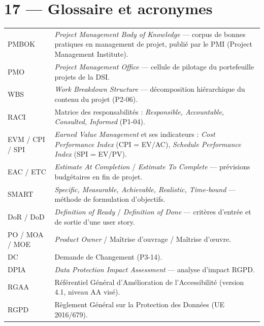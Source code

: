 \documentclass[11pt,a4paper,oneside]{report}
\begin{document}
\newpage
\section*{17 — Glossaire et acronymes}

\renewcommand{\arraystretch}{1.3}
\begin{tabularx}{\textwidth}{L{3cm} Y}
\toprule
{} &  \\
\midrule
PMBOK              & \textit{Project Management Body of Knowledge} — corpus de bonnes pratiques en management de projet, publié par le PMI (Project Management Institute). \\
PMO                & \textit{Project Management Office} — cellule de pilotage du portefeuille projets de la DSI. \\
WBS                & \textit{Work Breakdown Structure} — décomposition hiérarchique du contenu du projet (P2-06). \\
RACI               & Matrice des responsabilités : \textit{Responsible, Accountable, Consulted, Informed} (P1-04). \\
EVM / CPI / SPI    & \textit{Earned Value Management} et ses indicateurs : \textit{Cost Performance Index} (CPI = EV/AC), \textit{Schedule Performance Index} (SPI = EV/PV). \\
EAC / ETC          & \textit{Estimate At Completion} / \textit{Estimate To Complete} — prévisions budgétaires en fin de projet. \\
SMART              & \textit{Specific, Measurable, Achievable, Realistic, Time-bound} — méthode de formulation d'objectifs. \\
DoR / DoD          & \textit{Definition of Ready} / \textit{Definition of Done} — critères d'entrée et de sortie d'une user story. \\
PO / MOA / MOE     & \textit{Product Owner} / Maîtrise d'ouvrage / Maîtrise d'œuvre. \\
DC                 & Demande de Changement (P3-14). \\
DPIA               & \textit{Data Protection Impact Assessment} — analyse d'impact RGPD. \\
RGAA               & Référentiel Général d'Amélioration de l'Accessibilité (version 4.1, niveau AA visé). \\
RGPD               & Règlement Général sur la Protection des Données (UE 2016/679). \\

\end{tabularx}
\end{document}

